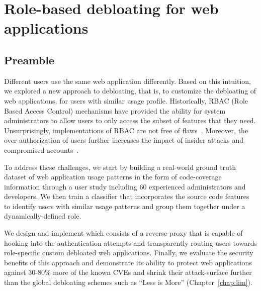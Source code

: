 \chapter{Role-based debloating for web applications}
\label{chap:dbltr}

\section*{Preamble}
Different users use the same web application differently. 
Based on this intuition, we explored a new approach to debloating, that is, to customize the debloating of web applications, for users with similar usage profile. 
Historically, RBAC (Role Based Access Control) mechanisms have provided the ability for system administrators to allow users to only access the subset of features that they need. 
Unsurprisingly, implementations of RBAC are not free of flaws~\cite{doupe2011fear, dalton2009nemesis, wpfilemanager}. 
Moreover, the over-authorization of users further increases the impact of insider attacks and compromised accounts~\cite{twitterviphack, oktahack}.

To address these challenges, we start by building a real-world ground truth dataset of web application usage patterns in the form of code-coverage information through a user study including 60 experienced administrators and developers. 
We then train a classifier that incorporates the source code features to identify users with similar usage patterns and group them together under a dynamically-defined role. 

We design and implement \dbltr{} which consists of a reverse-proxy that is capable of hooking into the authentication attempts and transparently routing users towards role-specific custom debloated web applications. 
Finally, we evaluate the security benefits of this approach and demonstrate its ability to protect web applications against 30-80\% more of the known CVEs and shrink their attack-surface further than the global debloating schemes such as ``Less is More'' (Chapter~\ref{chap:lim}). 







